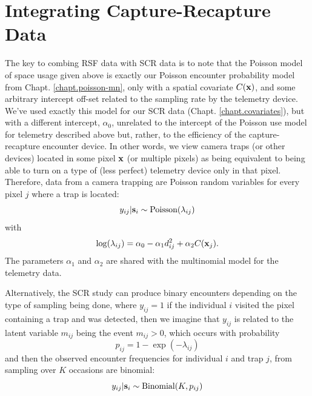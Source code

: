 \section{Integrating Capture-Recapture Data}

The key to combing RSF data with SCR data is to note that the Poisson
model of space usage given above is exactly our Poisson encounter
probability model from Chapt. \ref{chapt.poisson-mn}, only with a
spatial covariate $C({\bf x})$, and some arbitrary intercept off-set
related to the sampling rate by the telemetry device.  We've used
exactly this model for our SCR data (Chapt. \ref{chapt.covariates}),
but with a different intercept, $\alpha_{0}$, unrelated to the
intercept of the Poisson use model for telemetry described above but,
rather, to the efficiency of the capture-recapture encounter device.
In other words, we view camera traps (or other devices) located in
some pixel ${\bf x}$ (or multiple pixels) as being equivalent to being
able to turn on a type of (less perfect) telemetry device only in that
pixel.
Therefore, 
data from a camera trapping are Poisson random variables 
for every pixel $j$ where a trap is located:
\[
y_{ij}|{\bf s}_{i} \sim \mbox{Poisson}( \lambda_{ij})
\]
with 
\[
 \log(\lambda_{ij}) =  \alpha_{0} -\alpha_{1}
 d_{ij}^{2} +  \alpha_{2} C({\bf x}_{j}).
\]
The parameters $\alpha_{1}$ and $\alpha_{2}$ are shared with the
multinomial model for the telemetry data.

Alternatively, 
the SCR study can produce binary 
encounters depending on the type of sampling being done,
where $y_{ij} = 1$ if the individual $i$ visited
the pixel containing a trap and was detected, then we imagine that
$y_{ij}$ is related to the latent variable $m_{ij}$ being the event
$m_{ij}>0$, which occurs with probability
\begin{equation}
 p_{ij} = 1-\exp(- \lambda_{ij})
\label{rsf.eq.cloglog}
\end{equation}
and then the observed encounter frequencies for individual $i$ and trap $j$, from
sampling over $K$ occasions are binomial:
\[
 y_{ij}|{\bf s}_{i} \sim \mbox{Binomial}(K, p_{ij}) 
\]

